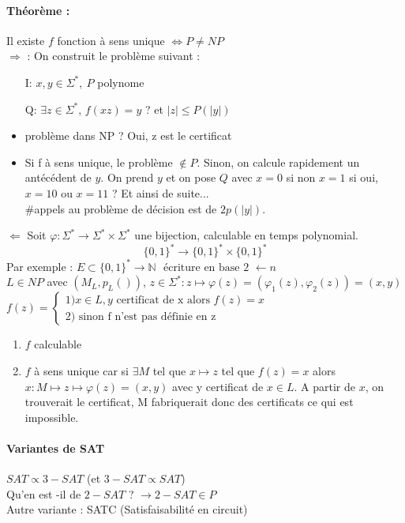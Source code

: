 \documentclass[12pt,a4paper]{report}
\begin{document}
\paragraph{Théorème :\\}
Il existe $f$ fonction à sens unique $\Longleftrightarrow P\neq NP$\\

$\Rightarrow$ : On construit le problème suivant :
\begin{itemize}
\item[I:] $x,y \in \Sigma^*,\ P$ polynome
\item[Q:] $\exists z \in \Sigma^*$, $f(xz)=y$ ? et $|z| \leqslant P(|y|)$
\end{itemize}
\begin{itemize}
\item problème dans NP ? Oui, z est le certificat
\item Si f à sens unique, le problème $\not\in P$. Sinon, on calcule rapidement un antécédent de $y$. On prend $y$ et on pose $Q$ avec $x=0$ si non $x=1$ si oui, $x=10$ ou $x=11$ ? Et ainsi de suite...\\
$\#$appels au problème de décision est de $2p(|y|)$.
\end{itemize}
$\Leftarrow$ Soit $\varphi : \Sigma^* \rightarrow \Sigma^* \times \Sigma^* $ une bijection, calculable en temps polynomial. 
$$ \{0,1\}^* \rightarrow \{0,1\}^* \times \{0,1\}^* $$
Par exemple : $ E \subset \{0,1\}^* \rightarrow \mathbb{N} $
$ \mbox{ écriture en base 2 } \leftarrow n $\\
$L \in NP$ avec $(M_L,p_L())$, $z\in \Sigma^* : z \longmapsto \varphi(z) = (\varphi_1(z), \varphi_2(z))=(x,y)$
$f(z)=\left\{ \begin{array}{l}
1) x \in L, y \mbox{ certificat de x alors } f(z)=x \\
2) \mbox{ sinon f n'est pas définie en z } \end{array} \right. $
\begin{enumerate}
\item $f$ calculable
\item $f$ à sens unique car si $\exists M$ tel que $x\mapsto z$ tel que $f(z)=x$ alors $x : M \mapsto z \mapsto \varphi(z) = (x,y)$ avec y certificat de $x\in L$. A partir de $x$, on trouverait le certificat, M fabriquerait donc des certificats ce qui est impossible.
\end{enumerate}
\paragraph{Variantes de SAT}
$ SAT \propto 3-SAT $ (et $ 3-SAT \propto SAT$)\\
Qu'en est -il de $2-SAT$ ? $\longrightarrow 2-SAT \in P$\\
Autre variante : SATC (Satisfaisabilité en circuit)
\end{document}
